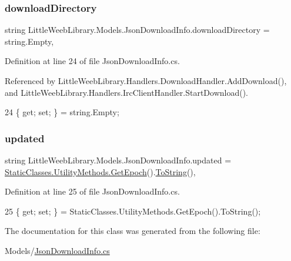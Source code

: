 \subsubsection{\texorpdfstring{download\+Directory}{downloadDirectory}}
{\footnotesize\ttfamily string Little\+Weeb\+Library.\+Models.\+Json\+Download\+Info.\+download\+Directory = string.\+Empty\hspace{0.3cm}{\ttfamily [get]}, {\ttfamily [set]}}



Definition at line 24 of file Json\+Download\+Info.\+cs.



Referenced by Little\+Weeb\+Library.\+Handlers.\+Download\+Handler.\+Add\+Download(), and Little\+Weeb\+Library.\+Handlers.\+Irc\+Client\+Handler.\+Start\+Download().


\begin{DoxyCode}
24 \{ \textcolor{keyword}{get}; \textcolor{keyword}{set}; \} = \textcolor{keywordtype}{string}.Empty;
\end{DoxyCode}
\mbox{\label{class_little_weeb_library_1_1_models_1_1_json_download_info_ae45b3e3afeb93f4cb92dc5bda3bd9535}} 
\subsubsection{\texorpdfstring{updated}{updated}}
{\footnotesize\ttfamily string Little\+Weeb\+Library.\+Models.\+Json\+Download\+Info.\+updated = \mbox{\hyperlink{class_little_weeb_library_1_1_static_classes_1_1_utility_methods_a12336d9e64983ddabaad8950486fafb2}{Static\+Classes.\+Utility\+Methods.\+Get\+Epoch}}().\mbox{\hyperlink{class_little_weeb_library_1_1_models_1_1_json_download_info_af36cbb3251b0efcd80a45f1fef89f5c9}{To\+String}}()\hspace{0.3cm}{\ttfamily [get]}, {\ttfamily [set]}}



Definition at line 25 of file Json\+Download\+Info.\+cs.


\begin{DoxyCode}
25 \{ \textcolor{keyword}{get}; \textcolor{keyword}{set}; \} = StaticClasses.UtilityMethods.GetEpoch().ToString();
\end{DoxyCode}


The documentation for this class was generated from the following file\+:\begin{DoxyCompactItemize}
\item 
Models/\mbox{\hyperlink{_json_download_info_8cs}{Json\+Download\+Info.\+cs}}\end{DoxyCompactItemize}

